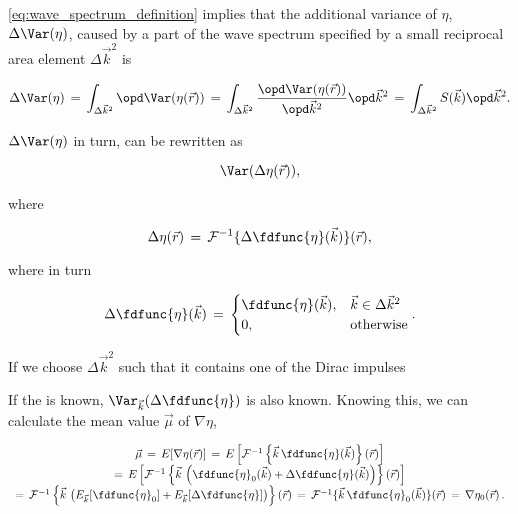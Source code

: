 {\eqref{eq:wave_spectrum_definition} implies that the additional variance of $\eta$, $\Delta\Var(\eta)$, caused by a part of the wave spectrum specified by a small reciprocal area element $\Delta\vec{k}^2$ is

\begin{equation}
\Delta\Var(\eta) \,=\, \int_{\Delta\vec{k}^2}\opd \Var(\eta(\vec{r})) \,=\, \int_{\Delta\vec{k}^2}\frac{\opd \Var(\eta(\vec{r}))}{\opd\vec{k}^2}\opd\vec{k}^2 \,=\, \int_{\Delta\vec{k}^2}S(\vec{k})\opd\vec{k}^2.
\end{equation}

$\Delta\Var(\eta)$ in turn, can be rewritten as

\begin{equation}
\Var(\Delta\eta(\vec{r})),
\end{equation}

where

\begin{equation}
\Delta\eta(\vec{r}) \,=\, \mathcal{F}^{-1}\{\Delta\fdfunc{\eta}(\vec{k})\}(\vec{r}),
\end{equation}

where in turn

\begin{equation}
\Delta\fdfunc{\eta}(\vec{k}) \,=\, \begin{cases}
\fdfunc{\eta}(\vec{k}), & \vec{k} \in \Delta\vec{k}^2 \\
0, & \text{otherwise}
\end{cases}.
\end{equation}

If we choose $\Delta\vec{k}^2$ such that it contains one of the Dirac impulses




















\HRule

If the  is known, $\Var_{\vec{k}}(\Delta\fdfunc{\eta})$ is also known. Knowing this, we can calculate the mean value $\vec{\mu}$ of $\nabla\eta$,

\begin{equation}
\begin{array}{c}
\vec{\mu} \,=\, E[\nabla\eta(\vec{r})] \,=\, E\left[\mathcal{F}^{-1}\left\{\vec{k}\,\fdfunc{\eta}(\vec{k})\right\}(\vec{r})\right] \\
=\, E\left[\mathcal{F}^{-1}\left\{\vec{k}\,\left(\fdfunc{\eta}_0(\vec{k})+\Delta\fdfunc{\eta}(\vec{k})\right)\right\}(\vec{r})\right] \\
=\, \mathcal{F}^{-1}\left\{\vec{k}\,\left(E_{\vec{k}}[\fdfunc{\eta}_0]+E_{\vec{k}}[\Delta\fdfunc{\eta}]\right)\right\}(\vec{r}) \,=\, \mathcal{F}^{-1}\{\vec{k}\,\fdfunc{\eta}_0(\vec{k})\}(\vec{r}) \,=\, \nabla\eta_0(\vec{r})\,.
\end{array}
\end{equation}

}
